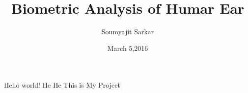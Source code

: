 \documentclass{article}
\title{Biometric Analysis of Humar Ear}
\author{Soumyajit Sarkar}
\date{March 5,2016}
\begin{document}
   \maketitle
   Hello world! He He This is My Project
\end{document}
